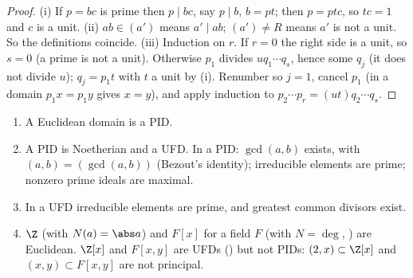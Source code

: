 \begin{proof}
(i) If $p=bc$ is prime then $p\mid bc$, say $p\mid b$, $b=pt$; then $p=ptc$, so $tc=1$ and $c$ is a unit.
(ii) $ab\in(a')$ means $a'\mid ab$; $(a')\ne R$ means $a'$ is not a unit. So the definitions coincide.
(iii) Induction on $r$. If $r=0$ the right side is a unit, so $s=0$ (a prime is not a unit). Otherwise $p_1$ divides
$uq_1\cdots q_s$, hence some $q_j$ (it does not divide $u$); $q_j=p_1t$ with $t$ a unit by (i). Renumber so $j=1$, cancel $p_1$ (in a
domain $p_1x=p_1y$ gives $x=y$), and apply induction to $p_2\cdots p_r=(ut)q_2\cdots q_s$.
\end{proof}

\begin{theorem}\label{thm:rings:euclid-pid-ufd}
\begin{enumerate}[label=(\roman*)]
\item A Euclidean domain is a PID.
\item A PID is Noetherian and a UFD. In a PID: $\gcd(a,b)$ exists, with $(a,b)=(\gcd(a,b))$ (Bezout's identity); irreducible elements are
prime; nonzero prime ideals are maximal.
\item In a UFD irreducible elements are prime, and greatest common divisors exist.
\item $\Z$ (with $N(a)=\abs a$) and $F[x]$ for a field $F$ (with $N=\deg$, ) are Euclidean. $\Z[x]$ and $F[x,y]$ are UFDs
() but not PIDs: $(2,x)\subset\Z[x]$ and $(x,y)\subset F[x,y]$ are not principal.
\end{enumerate}
\end{theorem}

